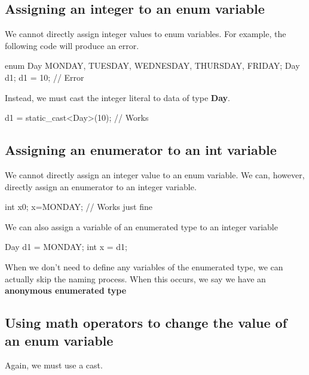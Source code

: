 \documentclass{report}
\begin{document}
    \bigbreak \noindent 
    \subsection{Assigning an integer to an enum variable}
    \bigbreak \noindent 
    We cannot directly assign integer values to enum variables. For example, the following code will produce an error.
    \bigbreak \noindent 
    
    \begin{cppcode}
enum Day { MONDAY, TUESDAY, WEDNESDAY, THURSDAY, FRIDAY};
Day d1;
d1 = 10; // Error
    \end{cppcode}
    
    \bigbreak \noindent 
    Instead, we must cast the integer literal to data of type \textbf{Day}. 
    \bigbreak \noindent 
    
    \begin{cppcode}
d1 = static_cast<Day>(10); // Works
    \end{cppcode}
    

    \pagebreak
    \subsection{Assigning an enumerator to an int variable}
    \bigbreak \noindent 
    We cannot directly assign an integer value to an enum variable. We can, however, directly assign an enumerator to an integer variable.
    \bigbreak \noindent 
    
    \begin{cppcode}
int x{0};
x=MONDAY; // Works just fine
    \end{cppcode}
    
    \bigbreak \noindent 
    We can also assign a variable of an enumerated type to an integer variable
    \bigbreak \noindent 
    
    \begin{cppcode}
Day d1 = MONDAY;
int x = d1;
    \end{cppcode}
    
    \bigbreak \noindent 
    When we don't need to define any variables of the enumerated type, we can actually skip the naming process. When this occurs, we say we have an \textbf{anonymous enumerated type}
    \bigbreak \noindent 
    \subsection{Using math operators to change the value of an enum variable}
    \bigbreak \noindent 
    Again, we must use a cast.
    \bigbreak \noindent 
    
\end{document}
